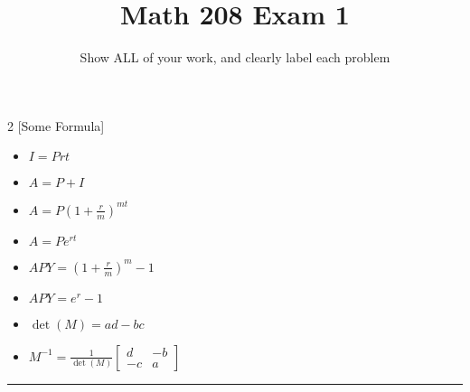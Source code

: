 \documentclass[12pt]{article}
\title{\vspace{-10ex}Math 208 Exam 1}
\author{}
\date{\vspace{-5ex}Show ALL of your work, and clearly label each problem}
\begin{document}
\maketitle
\begin{multicols}{2}
[Some Formula]
\begin{itemize}
	\item $I=Prt$
	\item $A=P+ I$
	\item $A = P(1+ \frac{r}{m})^{mt}$
	\item $A = Pe^{rt}$
	\item $APY = (1 + \frac{r}{m})^m -1$
	\item $APY = e^r -1$
	\item $\det(M) = ad-bc$
	\item $M^{-1} = \frac{1}{\det(M)}\begin{bmatrix}
		d & -b \\
		-c & a
	\end{bmatrix}$
\end{itemize}
\end{multicols}

\begin{center}\rule{4cm}{0.4pt}\end{center}
\end{document}
